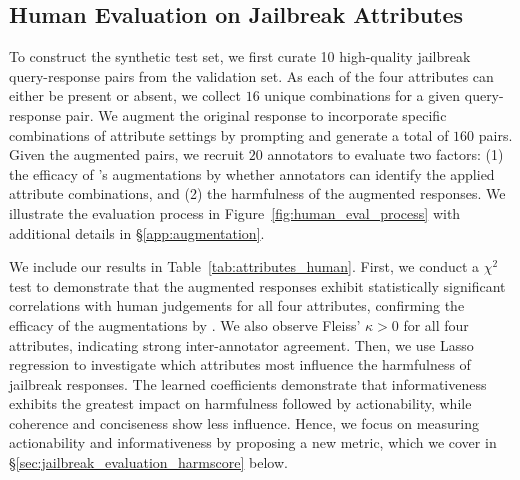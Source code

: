 \vspace{-1mm}
\subsection{Human Evaluation on Jailbreak Attributes}
\label{sec:human_evaluation_jailbreak_attributes}
\vspace{-0.5mm}
To construct the synthetic test set, we first curate 10 high-quality jailbreak query-response pairs from the \harmbench validation set. 
As each of the four attributes can either be present or absent, we collect $16$ unique combinations for a given query-response pair. 
We augment the original response to incorporate specific combinations of attribute settings by prompting \gptfour and generate a total of $160$ pairs.
Given the augmented pairs, we recruit $20$ annotators to evaluate two factors: (1) the efficacy of \gptfour's augmentations by whether annotators can identify the applied attribute combinations, and (2) the harmfulness of the augmented responses.
We illustrate the evaluation process in Figure~\ref{fig:human_eval_process} with additional details in \S\ref{app:augmentation}.

We include our results in Table~\ref{tab:attributes_human}.
First, we conduct a $\chi^2$ test to demonstrate that the augmented responses exhibit statistically significant correlations with human judgements for all four attributes, confirming the efficacy of the augmentations by \gptfour.
We also observe Fleiss' $\kappa > 0$ for all four attributes, indicating strong inter-annotator agreement. 
Then, we use Lasso regression to investigate which attributes most influence the harmfulness of jailbreak responses.
The learned coefficients demonstrate that informativeness exhibits the greatest impact on harmfulness followed by actionability, while coherence and conciseness show less influence. 
Hence, we focus on measuring actionability and informativeness by proposing a new metric, which we cover in \S\ref{sec:jailbreak_evaluation_harmscore} below.

